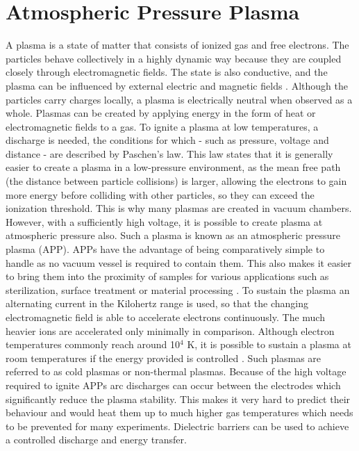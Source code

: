 \section{Atmospheric Pressure Plasma}
A plasma is a state of matter that consists of ionized gas and free electrons. The particles behave collectively in a highly dynamic way because they are coupled closely through electromagnetic fields. The state is also conductive, and the plasma can be influenced by external electric and magnetic fields \cite{plasma}. Although the particles carry charges locally, a plasma is electrically neutral when observed as a whole. Plasmas can be created by applying energy in the form of heat or electromagnetic fields to a gas. To ignite a plasma at low temperatures, a discharge is needed, the conditions for which - such as pressure, voltage and distance - are described by Paschen's law. This law states that it is generally easier to create a plasma in a low-pressure environment, as the mean free path (the distance between particle collisions) is larger, allowing the electrons to gain more energy before colliding with other particles, so they can exceed the ionization threshold. This is why many plasmas are created in vacuum chambers. However, with a sufficiently high voltage, it is  possible to create plasma at atmospheric pressure also. Such a plasma is known as an atmospheric pressure plasma (APP). APPs have the advantage of being comparatively simple to handle as no vacuum vessel is required to contain them. This also makes it easier to bring them into the proximity of samples for various applications such as sterilization, surface treatment or material processing \cite{plasma}. To sustain the plasma an alternating current in the Kilohertz range is used, so that the changing electromagnetic field is able to accelerate electrons continuously. The much heavier ions are accelerated only minimally in comparison. Although electron temperatures commonly reach around 10$^4$ K, it is possible to sustain a plasma at room temperatures if the energy provided is controlled \cite{plasma2}. Such plasmas are referred to as cold plasmas or non-thermal plasmas. Because of the high voltage required to ignite APPs arc discharges can occur between the electrodes which significantly reduce the plasma stability. This makes it very hard to predict their behaviour and would heat them up to much higher gas temperatures which needs to be prevented for many experiments. Dielectric barriers can be used to achieve a controlled discharge and energy transfer. 

